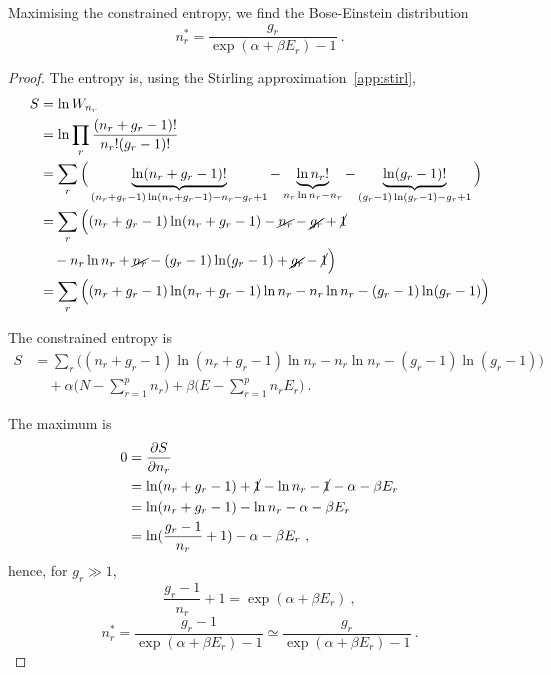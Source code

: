     Maximising the constrained entropy, we find the Bose-Einstein distribution 
    \begin{equation*}
        n_r^* = \frac{g_r}{\exp(\alpha + \beta E_r) - 1} ~.
    \end{equation*}
    \begin{proof}
        The entropy is, using the Stirling approximation~\eqref{app:stirl},
        \begin{equation*}
        \begin{aligned}
            S & = \ln W_{n_r} \\ & = \ln \prod_r \frac{(n_r + g_r - 1)!}{n_r! (g_r - 1)!} \\ & = \sum_r \Big (\underbrace{\ln (n_r + g_r - 1)!}_{(n_r + g_r - 1) \ln (n_r + g_r - 1) - n_r - g_r + 1} - \underbrace{\ln n_r!}_{n_r \ln n_r - n_r} - \underbrace{\ln (g_r - 1)!}_{(g_r - 1) \ln (g_r - 1) - g_r + 1} \Big ) \\ & = \sum_r \Big ( (n_r + g_r - 1) \ln (n_r + g_r - 1) - \cancel{n_r} - \cancel{g_r} + \cancel{1} \\ & \quad - n_r \ln n_r + \cancel{n_r }- (g_r - 1) \ln (g_r - 1) + \cancel{g_r} - \cancel{1} \Big ) \\ & = \sum_r \Big ( (n_r + g_r - 1) \ln (n_r + g_r - 1) \ln n_r - n_r \ln n_r - (g_r - 1) \ln (g_r - 1) \Big ) 
        \end{aligned}
        \end{equation*}
    
        The constrained entropy is
        \begin{equation*}
        \begin{aligned}
            S & = \sum_r \Big ( (n_r + g_r - 1) \ln (n_r + g_r - 1) \ln n_r - n_r \ln n_r - (g_r - 1) \ln (g_r - 1) \Big ) \\ & \quad + \alpha \Big (N - \sum_{r=1}^p n_r \Big) + \beta \Big (E - \sum_{r=1}^p n_r E_r \Big ) ~.
        \end{aligned}
        \end{equation*}
    
        The maximum is 
        \begin{equation*}
        \begin{aligned}
            0 & = \frac{\partial S}{\partial n_r} \\ & = \ln (n_r + g_r - 1) + \cancel{1} - \ln n_r - \cancel{1} - \alpha - \beta E_r \\ & = \ln (n_r + g_r - 1) - \ln n_r - \alpha - \beta E_r \\ & = \ln (\frac{g_r - 1}{n_r} + 1) - \alpha - \beta E_r~ ,
        \end{aligned}
        \end{equation*}
        hence, for $g_r \gg 1$,
        \begin{equation*}
            \frac{g_r - 1}{n_r} + 1 = \exp(\alpha + \beta E_r) ~,
        \end{equation*}
        \begin{equation*}
            n_r^* = \frac{g_r - 1}{\exp(\alpha + \beta E_r) - 1} \simeq \frac{g_r}{\exp(\alpha + \beta E_r) - 1} ~.
        \end{equation*}
    \end{proof}
